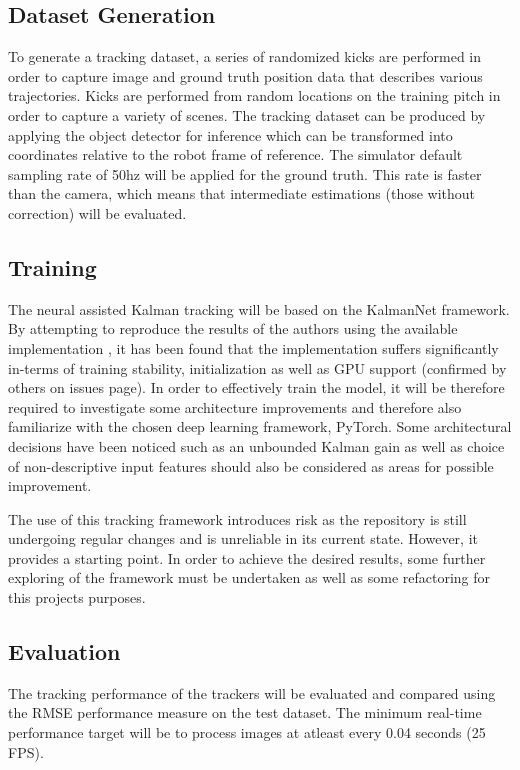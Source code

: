 \documentclass[a4paper,twoside,12pt]{report}
\begin{document}
\subsection{Dataset Generation}

To generate a tracking dataset, a series of randomized kicks are performed in order to capture image and ground truth position data that describes various trajectories. Kicks are performed from random locations on the training pitch in order to capture a variety of scenes. The tracking dataset can be produced by applying the object detector for inference which can be transformed into coordinates relative to the robot frame of reference. The simulator default sampling rate of 50hz will be applied for the ground truth. This rate is faster than the camera, which means that intermediate estimations (those without correction) will be evaluated.

\subsection{Training}
The neural assisted Kalman tracking will be based on the KalmanNet framework. By attempting to reproduce the results of the authors using the available implementation \cite{kalmangit}, it has been found that the implementation suffers significantly in-terms of training stability, initialization as well as GPU support (confirmed by others on issues page). In order to effectively train the model, it will be therefore required to investigate some architecture improvements and therefore  also familiarize with the chosen deep learning framework, PyTorch. Some architectural decisions have been noticed such as an unbounded Kalman gain as well as choice of non-descriptive input features should also be considered as areas for possible improvement.  

The use of this tracking framework introduces risk as the repository is still undergoing regular changes and is unreliable in its current state. However, it provides a starting point. In order to achieve the desired results, some further exploring of the framework must be undertaken as well as some refactoring for this projects purposes.

\subsection{Evaluation}

The tracking performance of the trackers will be evaluated and compared using the RMSE performance measure on the test dataset. The minimum real-time performance target will be to process images at atleast every 0.04 seconds (25 FPS).
\end{document}
